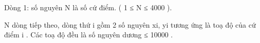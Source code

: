 Dòng 1: số nguyên N là số cứ điểm. ( 1 ≤ N ≤ 4000 ).   


   N dòng tiếp theo, dòng thứ i gồm 2 số nguyên xi, yi tương ứng là toạ độ của cứ điểm i . Các toạ độ đều là số nguyên dương ≤ 10000 .